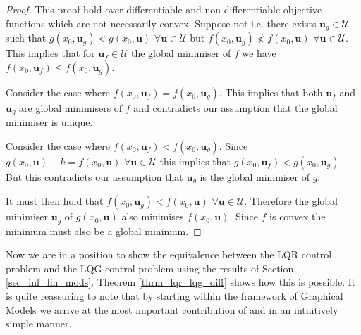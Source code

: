 \begin{proof}
This proof hold over differentiable and non-differentiable objective functions which are not necessarily convex. Suppose not i.e. there exists  $\mathbf{u}_g \in \mathcal{U}$ such that $g(x_0, \mathbf{u}_g) < g(x_0, \mathbf{u})$ $\forall \mathbf{u} \in \mathcal{U}$ but $f(x_0, \mathbf{u}_g) \nless f(x_0, \mathbf{u})$ $\forall \mathbf{u} \in \mathcal{U}$. This implies that for $\mathbf{u}_f \in \mathcal{U}$ the global minimiser of $f$  we have $f(x_0, \mathbf{u}_f) \leq f(x_0, \mathbf{u}_g)$. 

Consider the case where $f(x_0, \mathbf{u}_f) = f(x_0, \mathbf{u}_g)$. This implies that both $\mathbf{u}_f$ and $\mathbf{u}_g$ are global minimisers of $f$ and contradicts our assumption that the global minimiser is unique.

Consider the case where $f(x_0, \mathbf{u}_f) < f(x_0, \mathbf{u}_g)$. Since $g(x_0, \mathbf{u}) + k = f(x_0, \mathbf{u})$ $\forall \mathbf{u} \in \mathcal{U}$ this implies that $g(x_0, \mathbf{u}_f) < g(x_0, \mathbf{u}_g)$. But this contradicts our assumption that $\mathbf{u}_g$ is the global minimiser of $g$.

It must then hold that $f(x_0, \mathbf{u}_g) < f(x_0, \mathbf{u})$ $\forall \mathbf{u} \in \mathcal{U}$. Therefore the global minimiser $\mathbf{u}_g$ of $g(x_0, \mathbf{u})$ also minimises $f(x_0, \mathbf{u})$. Since $f$ is convex the minimum must also be a global minimum.
\end{proof}
Now we are in a position to show the equivalence between the LQR control problem and the LQG control problem using the results of Section \ref{sec_inf_lin_mods}. Theorem \ref{thrm_lqr_lqg_diff} shows how this is possible. It is quite reassuring to note that by starting within the framework of Graphical Models we arrive at the most important contribution of \cite{yan1} and \cite{yan2} in an intuitively simple manner.
